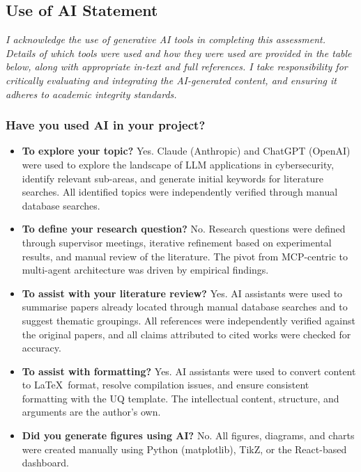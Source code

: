 \documentclass[../main.tex]{subfiles}
\begin{document}
\subsection*{Use of AI Statement}
\textit{I acknowledge the use of generative AI tools in completing this assessment. Details of which tools were used and how they were used are provided in the table below, along with appropriate in-text and full references. I take responsibility for critically evaluating and integrating the AI-generated content, and ensuring it adheres to academic integrity standards.}

\subsubsection*{Have you used AI in your project?}
\begin{itemize}[leftmargin=1.5em, itemsep=0.3em]
  \item \textbf{To explore your topic?} Yes. Claude (Anthropic) and ChatGPT (OpenAI) were used to explore the landscape of LLM applications in cybersecurity, identify relevant sub-areas, and generate initial keywords for literature searches. All identified topics were independently verified through manual database searches.

  \item \textbf{To define your research question?} No. Research questions were defined through supervisor meetings, iterative refinement based on experimental results, and manual review of the literature. The pivot from MCP-centric to multi-agent architecture was driven by empirical findings.

  \item \textbf{To assist with your literature review?} Yes. AI assistants were used to summarise papers already located through manual database searches and to suggest thematic groupings. All references were independently verified against the original papers, and all claims attributed to cited works were checked for accuracy.

  \item \textbf{To assist with formatting?} Yes. AI assistants were used to convert content to \LaTeX\ format, resolve compilation issues, and ensure consistent formatting with the UQ template. The intellectual content, structure, and arguments are the author's own.

  \item \textbf{Did you generate figures using AI?} No. All figures, diagrams, and charts were created manually using Python (matplotlib), TikZ, or the React-based dashboard.


\end{itemize}
\end{document}
